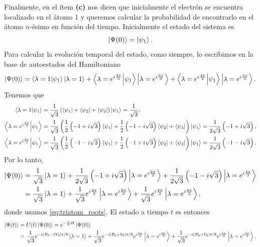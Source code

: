 \documentclass[10pt, a4paper]{article}
\numberwithin{equation}{subsection}
\begin{document}
\bigbreak

Finalmente, en el ítem \textbf{(c)} nos dicen que inicialmente el electrón se
encuentra localizado en el átomo 1 y queremos calcular la probabilidad de
encontrarlo en el átomo $n$-ésimo en función del tiempo. Inicialmente el
estado del sistema es
\begin{equation}
  \ket{\Psi(0)} = \ket{\psi_1}.
\end{equation}
Para calcular la evolución temporal del estado, como siempre, lo escribimos en
la base de autoestados del Hamiltoniano
\begin{equation}
  \ket{\Psi(0)} = \braket{\lambda = 1}{\psi_1} \ket{\lambda = 1} +
    \braket{\lambda = e^{i\frac{2\pi}{3}}}{\psi_1} \ket{\lambda =
    e^{i\frac{2\pi}{3}}} + \braket{\lambda = e^{i\frac{4\pi}{3}}}{\psi_1}
    \ket{\lambda = e^{i\frac{4\pi}{3}}}.
\end{equation}
Tenemos que
\begin{align}
  \braket{\lambda = 1}{\psi_1} &= \frac{1}{\sqrt{3}}\left(\bra{\psi_1} +
    \bra{\psi_2} + \bra{\psi_3}\right)\ket{\psi_1} = \frac{1}{\sqrt{3}}, \\
  \braket{\lambda = e^{i\frac{2\pi}{3}}}{\psi_1} &= 
    \frac{1}{\sqrt{3}}\left(
    \frac{1}{2}\left(-1 + i\sqrt{3}\right)\bra{\psi_1} + 
    \frac{1}{2}\left(-1 - i\sqrt{3}\right)\bra{\psi_2} + \bra{\psi_3}\right)
    \ket{\psi_1} = \frac{1}{2\sqrt{3}}\left(-1 + i\sqrt{3}\right), \\
  \braket{\lambda = e^{i\frac{2\pi}{3}}}{\psi_1} &= 
    \frac{1}{\sqrt{3}}\left(
    \frac{1}{2}\left(-1 - i\sqrt{3}\right)\bra{\psi_1} + 
    \frac{1}{2}\left(-1 + i\sqrt{3}\right)\bra{\psi_2} + \bra{\psi_3}\right)
    \ket{\psi_1} = \frac{1}{2\sqrt{3}}\left(-1 - i\sqrt{3}\right).
\end{align}
Por lo tanto,
\begin{align}
  \ket{\Psi(0)} &= \frac{1}{\sqrt{3}}\ket{\lambda = 1} +
    \frac{1}{2\sqrt{3}}\left(-1 + i\sqrt{3}\right) \ket{\lambda =
    e^{i\frac{2\pi}{3}}} +
    \frac{1}{2\sqrt{3}}\left(-1 - i\sqrt{3}\right) \ket{\lambda =
    e^{i\frac{4\pi}{3}}} \nonumber \\
  &= \frac{1}{\sqrt{3}}\ket{\lambda = 1} +
    \frac{1}{\sqrt{3}}e^{i\frac{2\pi}{3}} \ket{\lambda =
    e^{i\frac{2\pi}{3}}} +
    \frac{1}{\sqrt{3}}e^{i\frac{4\pi}{3}} \ket{\lambda =
    e^{i\frac{4\pi}{3}}} ,
\end{align}
donde usamos \eqref{eq:triatom_roots}. El estado a tiempo $t$ es entonces
\begin{align}
  \ket{\Psi(t)} &= U(t)\ket{\Psi(0)} = e^{-\frac{it}{\hbar}H}\ket{\Psi(0)}
    \nonumber \\
  &= \frac{1}{\sqrt{3}} e^{-{i(E_0-2V_0)t}/{\hbar}} \ket{\lambda = 1} +
    \frac{1}{\sqrt{3}} e^{-{i(E_0+V_0)t}/{\hbar}} e^{i\frac{2\pi}{3}}
    \ket{\lambda = e^{i\frac{2\pi}{3}}} +
    \frac{1}{\sqrt{3}} e^{-{i(E_0+V_0)t}/{\hbar}} e^{i\frac{4\pi}{3}}
    \ket{\lambda = e^{i\frac{4\pi}{3}}}.
\end{align}
\end{document}
